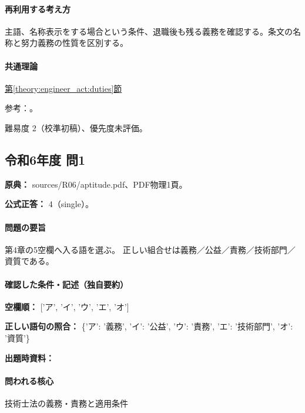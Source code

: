\paragraph{再利用する考え方} 主語、名称表示をする場合という条件、退職後も残る義務を確認する。条文の名称と努力義務の性質を区別する。

\paragraph{共通理論} \hyperref[theory:engineer_act:duties]{第\ref*{theory:engineer_act:duties}節}

\par 参考：\cite{engineer_act_current}。

\par 難易度 2（校準初稿）、優先度未評価。

\subsection{令和6年度 問1}
\label{q:r06-reg-apt-01}

\noindent\textbf{原典：} sources/R06/aptitude.pdf、PDF物理1頁。

\textbf{公式正答：} 4（single）。

\paragraph{問題の要旨} 第4章の5空欄へ入る語を選ぶ。 正しい組合せは義務／公益／責務／技術部門／資質である。

\paragraph{確認した条件・記述（独自要約）}\mbox{}\par

\noindent\textbf{空欄順：} ['ア', 'イ', 'ウ', 'エ', 'オ']\par

\noindent\textbf{正しい語句の照合：} \{'ア': '義務', 'イ': '公益', 'ウ': '責務', 'エ': '技術部門', 'オ': '資質'\}\par

\noindent\textbf{出題時資料：} \par

\paragraph{問われる核心} 技術士法の義務・責務と適用条件

